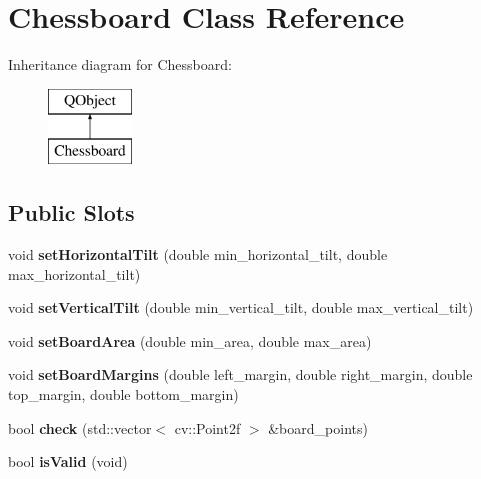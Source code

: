 \hypertarget{class_chessboard}{}\section{Chessboard Class Reference}
\label{class_chessboard}
Inheritance diagram for Chessboard\+:\begin{figure}[H]
\begin{center}
\leavevmode
\includegraphics[height=2.000000cm]{class_chessboard}
\end{center}
\end{figure}
\subsection*{Public Slots}
\begin{DoxyCompactItemize}
\item 
\hypertarget{class_chessboard_a8fbbd9febc14f3ae267b7d604a707881}{}void {\bfseries set\+Horizontal\+Tilt} (double min\+\_\+horizontal\+\_\+tilt, double max\+\_\+horizontal\+\_\+tilt)\label{class_chessboard_a8fbbd9febc14f3ae267b7d604a707881}

\item 
\hypertarget{class_chessboard_a24bdb477cbcfbc5c4c8c12bfd1071766}{}void {\bfseries set\+Vertical\+Tilt} (double min\+\_\+vertical\+\_\+tilt, double max\+\_\+vertical\+\_\+tilt)\label{class_chessboard_a24bdb477cbcfbc5c4c8c12bfd1071766}

\item 
\hypertarget{class_chessboard_a5a12f6cf4a21d747cfb3750138a45d4f}{}void {\bfseries set\+Board\+Area} (double min\+\_\+area, double max\+\_\+area)\label{class_chessboard_a5a12f6cf4a21d747cfb3750138a45d4f}

\item 
\hypertarget{class_chessboard_afa4754bf5a642a988299484ec15c1866}{}void {\bfseries set\+Board\+Margins} (double left\+\_\+margin, double right\+\_\+margin, double top\+\_\+margin, double bottom\+\_\+margin)\label{class_chessboard_afa4754bf5a642a988299484ec15c1866}

\item 
\hypertarget{class_chessboard_ae0e3fed17637712166ababe977e88ae5}{}bool {\bfseries check} (std\+::vector$<$ cv\+::\+Point2f $>$ \&board\+\_\+points)\label{class_chessboard_ae0e3fed17637712166ababe977e88ae5}

\item 
\hypertarget{class_chessboard_a9fed083db7f8b8576730d80131d5b506}{}bool {\bfseries is\+Valid} (void)\label{class_chessboard_a9fed083db7f8b8576730d80131d5b506}

\end{DoxyCompactItemize}
